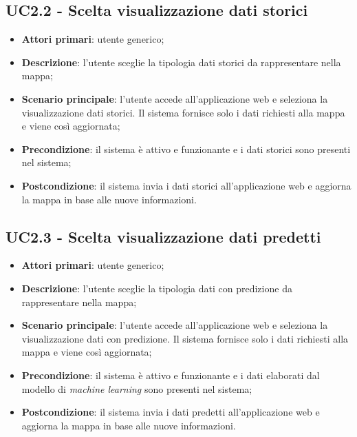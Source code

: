 \subsection{UC2.2 - Scelta visualizzazione dati storici}
\begin{itemize}
	\item \textbf{Attori primari}: utente generico;
	\item \textbf{Descrizione}: l'utente sceglie la tipologia dati storici da rappresentare nella mappa;
	\item \textbf{Scenario principale}: l'utente accede all'applicazione web e seleziona la visualizzazione dati storici. Il sistema fornisce solo i dati richiesti alla mappa e viene così aggiornata;
	\item \textbf{Precondizione}: il sistema è attivo e funzionante e i dati storici sono presenti nel sistema;
	\item \textbf{Postcondizione}: il sistema invia i dati storici all'applicazione web e aggiorna la mappa in base alle nuove informazioni.
\end{itemize}

\subsection{UC2.3 - Scelta visualizzazione dati predetti}
\begin{itemize}
	\item \textbf{Attori primari}: utente generico;
	\item \textbf{Descrizione}: l'utente sceglie la tipologia dati con predizione da rappresentare nella mappa;
	\item \textbf{Scenario principale}: l'utente accede all'applicazione web e seleziona la visualizzazione dati con predizione. Il sistema fornisce solo i dati richiesti alla mappa e viene così aggiornata;
	\item \textbf{Precondizione}: il sistema è attivo e funzionante e i dati elaborati dal modello di \textit{machine learning} sono presenti nel sistema;
	\item \textbf{Postcondizione}: il sistema invia i dati predetti all'applicazione web e aggiorna la mappa in base alle nuove informazioni.
\end{itemize}


